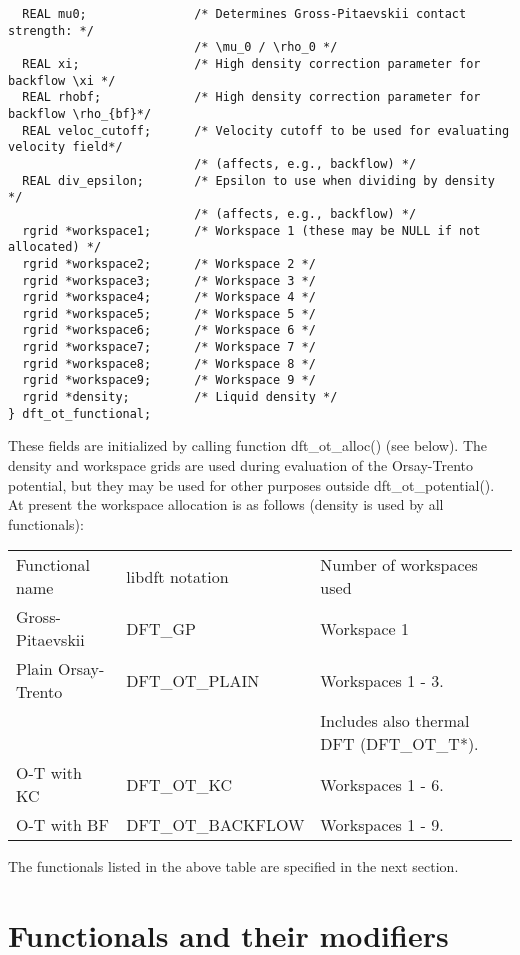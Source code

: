 \documentclass[12pt,letterpaper]{report}
\begin{document}
\begin{verbatim}
  REAL mu0;               /* Determines Gross-Pitaevskii contact strength: */
                          /* \mu_0 / \rho_0 */
  REAL xi;                /* High density correction parameter for backflow \xi */
  REAL rhobf;             /* High density correction parameter for backflow \rho_{bf}*/
  REAL veloc_cutoff;      /* Velocity cutoff to be used for evaluating velocity field*/
                          /* (affects, e.g., backflow) */
  REAL div_epsilon;       /* Epsilon to use when dividing by density */
                          /* (affects, e.g., backflow) */
  rgrid *workspace1;      /* Workspace 1 (these may be NULL if not allocated) */
  rgrid *workspace2;      /* Workspace 2 */
  rgrid *workspace3;      /* Workspace 3 */
  rgrid *workspace4;      /* Workspace 4 */
  rgrid *workspace5;      /* Workspace 5 */
  rgrid *workspace6;      /* Workspace 6 */
  rgrid *workspace7;      /* Workspace 7 */
  rgrid *workspace8;      /* Workspace 8 */
  rgrid *workspace9;      /* Workspace 9 */
  rgrid *density;         /* Liquid density */
} dft_ot_functional;
\end{verbatim}

\noindent
These fields are initialized by calling function dft\_ot\_alloc() (see below). The density and workspace grids are used during evaluation of the Orsay-Trento potential, but they may be used for other purposes outside dft\_ot\_potential(). At present the workspace allocation is as follows (density is used by all functionals):

\begin{tabular}{lll}
Functional name & libdft notation & Number of workspaces used\\
\cline{1-3}
Gross-Pitaevskii & DFT\_GP & Workspace 1\\
Plain Orsay-Trento & DFT\_OT\_PLAIN & Workspaces 1 - 3.\\
 & & Includes also thermal DFT (DFT\_OT\_T*).\\
O-T with KC & DFT\_OT\_KC & Workspaces 1 - 6.\\
O-T with BF & DFT\_OT\_BACKFLOW & Workspaces 1 - 9.\\
\end{tabular}

\noindent
The functionals listed in the above table are specified in the next section.

\section{Functionals and their modifiers}
\end{document}
